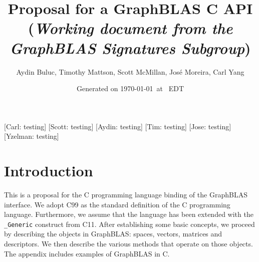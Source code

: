 \documentclass[11pt]{extarticle}
\begin{document}
\title{Proposal for a GraphBLAS C API\\ (\emph{\large Working document from the \emph{GraphBLAS} Signatures Subgroup})}
\author{Aydin Buluc, Timothy Mattson, Scott McMillan, Jos\'e Moreira, Carl Yang}
\date{Generated on \today\ at \currenttime\ EDT}

\renewcommand{\vector}[1]{{\bf #1}}
\renewcommand{\matrix}[1]{{\bf #1}}
\newcommand{\zip}{{\mbox{zip}}}
\newcommand{\zap}{{\mbox{zap}}}
\newcommand{\ewiseadd}{{\mbox{\bf ewiseadd}}}
\newcommand{\ewisemult}{{\mbox{\bf ewisemult}}}
\newcommand{\mxm}{{\mbox{\bf mxm}}}
\newcommand{\vxm}{{\mbox{\bf vxm}}}
\newcommand{\mxv}{{\mbox{\bf mxv}}}
\newcommand{\gpit}[1]{{\sf #1}}
\newcommand{\ie}{\emph{i.e.}}
\newcommand{\nan}{{\sf NaN}}
\newcommand{\nil}{{\bf nil}}
\newcommand{\ifif}{{\bf if}}
\newcommand{\ifthen}{{\bf then}}
\newcommand{\ifelse}{{\bf else}}
\newcommand{\ifendif}{{\bf endif}}
\newcommand{\zero}{{\bf 0}}
\newcommand{\one}{{\bf 1}}

\newcommand{\aydin}[1]{{{\color{olive}[Aydin: #1]}}}
\newcommand{\scott}[1]{{{\color{violet}[Scott: #1]}}}
\newcommand{\tim}[1]{{{\color{teal}[Tim: #1]}}}
\newcommand{\jose}[1]{{{\color{red}[Jose: #1]}}}
\newcommand{\carl}[1]{{{\color{blue}[Carl: #1]}}}
\newcommand{\ajy}[1]{{{\color{brown}[Yzelman: #1]}}}

\setlength{\parskip}{0.5\baselineskip}
\setlength{\parindent}{0ex}

\maketitle

\carl{testing}
\scott{testing}
\aydin{testing}
\tim{testing}
\jose{testing}
\ajy{testing}

\section{Introduction}

This is a proposal for the C programming language binding of the
GraphBLAS interface. We adopt C99 as the standard definition of the C
programming language.  Furthermore, we assume that the language has been
extended with the {\tt \_Generic} construct from C11.  After establishing
some basic concepts, we proceed by describing the objects in GraphBLAS:
spaces, vectors, matrices and descriptors. We then describe the various
methods that operate on those objects. The appendix includes examples
of GraphBLAS in C.
\end{document}

